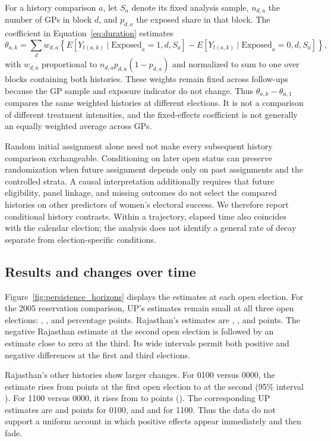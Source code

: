For a history comparison $a$, let $S_a$ denote its fixed analysis sample, $n_{d,a}$ the number of GPs in block $d$, and $p_{d,a}$ the exposed share in that block. The coefficient in Equation~\ref{eq:duration} estimates
\begin{equation}\label{eq:duration_estimand}
\theta_{a,k} = \sum_d w_{d,a}\left\{
 E[Y_{t(a,k)}\mid \text{Exposed}_a=1,d,S_a]
 - E[Y_{t(a,k)}\mid \text{Exposed}_a=0,d,S_a]\right\},
\end{equation}
\noindent with $w_{d,a}$ proportional to $n_{d,a}p_{d,a}(1-p_{d,a})$ and normalized to sum to one over blocks containing both histories. These weights remain fixed across follow-ups because the GP sample and exposure indicator do not change. Thus $\theta_{a,k}-\theta_{a,1}$ compares the same weighted histories at different elections. It is not a comparison of different treatment intensities, and the fixed-effects coefficient is not generally an equally weighted average across GPs.

Random initial assignment alone need not make every subsequent history comparison exchangeable. Conditioning on later open status can preserve randomization when future assignment depends only on past assignments and the controlled strata. A causal interpretation additionally requires that future eligibility, panel linkage, and missing outcomes do not select the compared histories on other predictors of women's electoral success. We therefore report conditional history contrasts. Within a trajectory, elapsed time also coincides with the calendar election; the analysis does not identify a general rate of decay separate from election-specific conditions.

\subsection{Results and changes over time}

Figure~\ref{fig:persistence_horizons} displays the estimates at each open election. For the 2005 reservation comparison, UP's estimates remain small at all three open elections: \persistUpFirst{}, \persistUpSecond{}, and \persistUpThird{} percentage points. Rajasthan's estimates are \persistRajFirst{}, \persistRajSecond{}, and \persistRajThird{} points. The negative Rajasthan estimate at the second open election is followed by an estimate close to zero at the third. Its wide intervals permit both positive and negative differences at the first and third elections.

Rajasthan's other histories show larger changes. For 0100 versus 0000, the estimate rises from \persistRajLaterFirst{} points at the first open election to \persistRajLaterSecond{} at the second (95\% interval \persistRajLaterSecondInterval{}). For 1100 versus 0000, it rises from \persistRajDoubleFirst{} to \persistRajDoubleSecond{} points (\persistRajDoubleSecondInterval{}). The corresponding UP estimates are \persistUpLaterFirst{} and \persistUpLaterSecond{} points for 0100, and \persistUpDoubleFirst{} and \persistUpDoubleSecond{} for 1100. Thus the data do not support a uniform account in which positive effects appear immediately and then fade.

